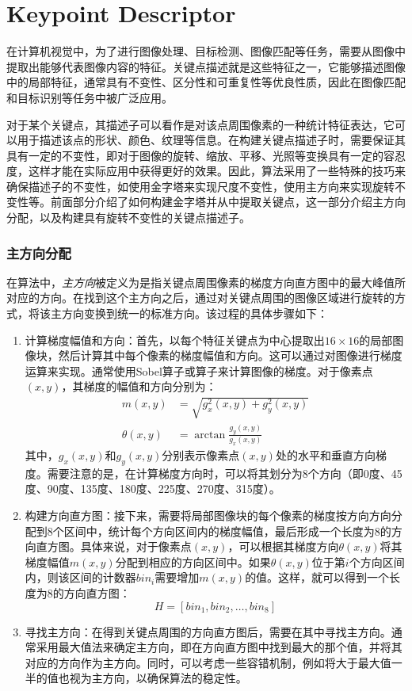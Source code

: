 \part{Keypoint Descriptor}\label{part:SIFT descriptor}

在计算机视觉中，为了进行图像处理、目标检测、图像匹配等任务，需要从图像中提取出能够代表图像内容的特征。关键点描述就是这些特征之一，它能够描述图像中的局部特征，通常具有不变性、区分性和可重复性等优良性质，因此在图像匹配和目标识别等任务中被广泛应用。

对于某个关键点，其描述子可以看作是对该点周围像素的一种统计特征表达，它可以用于描述该点的形状、颜色、纹理等信息。在构建关键点描述子时，需要保证其具有一定的不变性，即对于图像的旋转、缩放、平移、光照等变换具有一定的容忍度，这样才能在实际应用中获得更好的效果。因此，\sift 算法采用了一些特殊的技巧来确保描述子的不变性，如使用\DoG 金字塔来实现尺度不变性，使用主方向来实现旋转不变性等。前面部分介绍了如何构建\DoG 金字塔并从中提取关键点，这一部分介绍主方向分配，以及构建具有旋转不变性的关键点描述子。

\section{主方向分配}

在\sift 算法中，\emph{主方向}被定义为是指关键点周围像素的梯度方向直方图中的最大峰值所对应的方向。在找到这个主方向之后，通过对关键点周围的图像区域进行旋转的方式，将该主方向变换到统一的标准方向。该过程的具体步骤如下：
\begin{enumerate}
    \item 计算梯度幅值和方向：首先，以每个\sift 特征关键点为中心提取出$16\times 16$的局部图像块，然后计算其中每个像素的梯度幅值和方向。这可以通过对图像进行梯度运算来实现。通常使用Sobel算子或\lpl 算子来计算图像的梯度。对于像素点$(x,y)$，其梯度的幅值和方向分别为：
    \begin{align*}
        m(x, y)&=\sqrt{g_x^2(x, y) + g_y^2(x, y)}\\
        \theta (x, y)&=\arctan \frac{g_y(x, y)}{g_x(x, y)}
    \end{align*}
    其中，$g_x(x,y)$和$g_y(x,y)$分别表示像素点$(x,y)$处的水平和垂直方向梯度。需要注意的是，在计算梯度方向时，可以将其划分为8个方向（即0度、45度、90度、135度、180度、225度、270度、315度）。
    \item 构建方向直方图：接下来，需要将局部图像块的每个像素的梯度按方向方向分配到8个区间中，统计每个方向区间内的梯度幅值，最后形成一个长度为8的方向直方图。具体来说，对于像素点$(x,y)$，可以根据其梯度方向$\theta(x,y)$将其梯度幅值$m(x,y)$分配到相应的方向区间中。如果$\theta(x,y)$位于第$i$个方向区间内，则该区间的计数器$bin_i$需要增加$m(x,y)$的值。这样，就可以得到一个长度为8的方向直方图：
    \begin{equation*}
        H = \left[bin_1, bin_2, \ldots, bin_8\right]
    \end{equation*}
    \item 寻找主方向：在得到关键点周围的方向直方图后，需要在其中寻找主方向。通常采用最大值法来确定主方向，即在方向直方图中找到最大的那个值，并将其对应的方向作为主方向。同时，可以考虑一些容错机制，例如将大于最大值一半的值也视为主方向，以确保算法的稳定性。
\end{enumerate}

